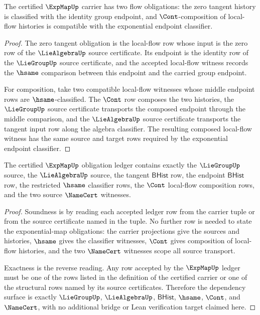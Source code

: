 \begin{theorem}
\label{thm:expmap-flow-and-zero-obligations}
The certified $\ExpMapUp$ carrier has two flow obligations: the zero tangent history is classified with the identity group endpoint, and $\Cont$-composition of local-flow histories is compatible with the exponential endpoint classifier.
\end{theorem}
\begin{proof}
The zero tangent obligation is the local-flow row whose input is the zero row of the $\LieAlgebraUp$ source certificate. Its endpoint is the identity row of the $\LieGroupUp$ source certificate, and the accepted local-flow witness records the $\hsame$ comparison between this endpoint and the carried group endpoint.

For composition, take two compatible local-flow witnesses whose middle endpoint rows are $\hsame$-classified. The $\Cont$ row composes the two histories, the $\LieGroupUp$ source certificate transports the composed endpoint through the middle comparison, and the $\LieAlgebraUp$ source certificate transports the tangent input row along the algebra classifier. The resulting composed local-flow witness has the same source and target rows required by the exponential endpoint classifier.
\end{proof}

\begin{theorem}
\label{thm:expmap-ledger-and-dependency-obligations}
The certified $\ExpMapUp$ obligation ledger contains exactly the $\LieGroupUp$ source, the $\LieAlgebraUp$ source, the tangent $\mathsf{BHist}$ row, the endpoint $\mathsf{BHist}$ row, the restricted $\hsame$ classifier rows, the $\Cont$ local-flow composition rows, and the two source $\NameCert$ witnesses.
\end{theorem}
\begin{proof}
Soundness is by reading each accepted ledger row from the carrier tuple or from the source certificate named in the tuple. No further row is needed to state the exponential-map obligations: the carrier projections give the sources and histories, $\hsame$ gives the classifier witnesses, $\Cont$ gives composition of local-flow histories, and the two $\NameCert$ witnesses scope all source transport.

Exactness is the reverse reading. Any row accepted by the $\ExpMapUp$ ledger must be one of the rows listed in the definition of the certified carrier or one of the structural rows named by its source certificates. Therefore the dependency surface is exactly $\LieGroupUp$, $\LieAlgebraUp$, $\mathsf{BHist}$, $\hsame$, $\Cont$, and $\NameCert$, with no additional bridge or Lean verification target claimed here.
\end{proof}

